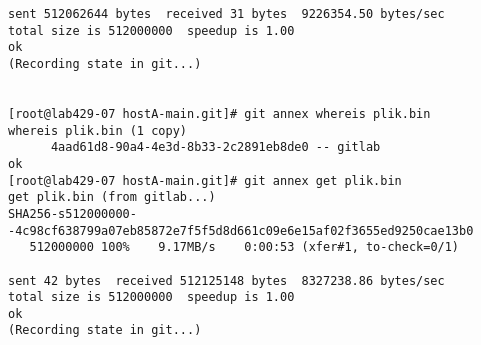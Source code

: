 \documentclass[polish]{article}
\begin{document}
\begin{enumerate}
\begin{lstlisting}[frame=single, caption=Wynik]
sent 512062644 bytes  received 31 bytes  9226354.50 bytes/sec
total size is 512000000  speedup is 1.00
ok
(Recording state in git...)


[root@lab429-07 hostA-main.git]# git annex whereis plik.bin
whereis plik.bin (1 copy)
      4aad61d8-90a4-4e3d-8b33-2c2891eb8de0 -- gitlab
ok
[root@lab429-07 hostA-main.git]# git annex get plik.bin
get plik.bin (from gitlab...)
SHA256-s512000000--4c98cf638799a07eb85872e7f5f5d8d661c09e6e15af02f3655ed9250cae13b0
   512000000 100%    9.17MB/s    0:00:53 (xfer#1, to-check=0/1)

sent 42 bytes  received 512125148 bytes  8327238.86 bytes/sec
total size is 512000000  speedup is 1.00
ok
(Recording state in git...)
    \end{lstlisting}
\fi

\end{enumerate}
\end{document}
